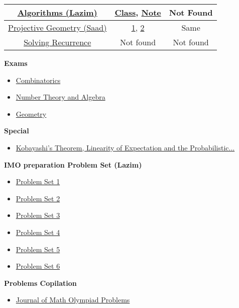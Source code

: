 \documentclass{article}
\begin{document}
\begin{center}
\begin{tabular}{|c|c|c|}
			\hline 
			\href{https://www.youtube.com/watch?v=VjXhzp-hYoE}{Algorithms (Lazim)} & \href{https://drive.google.com/file/d/1p0i6hqSbMrBuEjdoiQCPlfXQlBMAtMJ3/view}{Class}, \href{https://drive.google.com/file/d/1KeTtY-0IxhPWDcDFvvau15P9_OEyCuq_/view}{Note} & Not Found \\
			\hline 
			\href{https://www.youtube.com/watch?v=P4FN_-LOEx4}{Projective Geometry (Saad)} & \href{https://drive.google.com/file/d/1MfmQFOs-N120PnhCfIheByLBQKbua9Jl/view}{1}, \href{https://drive.google.com/file/d/14VtTlUP3GvV1vjV_Njt5o0TbSzBvfE0-/view}{2} & Same \\
			\hline 
			\href{https://www.youtube.com/watch?v=Jh8VFmv5_s4}{Solving Recurrence } & Not found & Not found \\
			\hline 
		\end{tabular} 
	\end{center}
	\vspace{.5 cm}
	\textbf{Exams}
	\begin{itemize}
		\item \href{https://drive.google.com/file/d/1tu6UKZj4x-KOPgCbEauQ6iH3Dbb0q5L1/view}{Combinatorics} 
		\item \href{https://drive.google.com/file/d/1Af5VmNKJBZozeH0Bl_xJBOtDuspniAlw/view}{Number Theory and Algebra} 
		\item \href{https://drive.google.com/file/d/1zdWs66MRHcBq4OXi4tnd9jzptWGBzInK/view}{Geometry}
	\end{itemize}
	
	\textbf{Special}
	\begin{itemize}
		\item \href{https://www.youtube.com/watch?v=uffz6cNcsHU}{Kobayashi's Theorem, Linearity of Expectation and the Probabilistic...} 
	\end{itemize}

	\textbf{IMO preparation Problem Set (Lazim)}
	\begin{itemize}
		\item \href{https://drive.google.com/file/d/1B1xvsDU159nrHlo4exArrx7DL5cdPOtt/view?usp=sharing}{Problem Set 1}
		\item \href{https://drive.google.com/file/d/1BHr1Q6sSfQIvXUum5gM3v1wFZc8_-0H4/view?usp=sharing}{Problem Set 2}
		\item \href{https://drive.google.com/file/d/12QiWO7Q7ac19BiFCqyVDyaaeP5qCrOrb/view?usp=sharing}{Problem Set 3}
		\item \href{https://drive.google.com/file/d/1hGYGX_Xa-imZ3B-NH76BEmOV2z31smkd/view?usp=sharing}{Problem Set 4}
		\item \href{https://drive.google.com/file/d/1FlPP7cSw_CBh5CJ7iN2Ml0VGUSZjaOcp/view?usp=sharing}{Problem Set 5}
		\item \href{https://drive.google.com/file/d/1vSohi2c9lUvdn6mt-rNeudjlxraJzLXW/view?usp=sharing}{Problem Set 6}
		
		
	\end{itemize}

	\textbf{Problems Copilation}
	\begin{itemize}
		\item \href{https://drive.google.com/file/d/1aOZu3YDVouPRjE1HQcVb3wFYF2xK3Pti/view?usp=sharing}{Journal of Math Olympiad Problems}
	\end{itemize}
\end{document}
